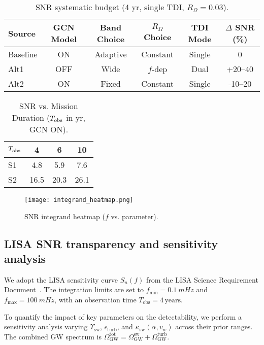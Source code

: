 \documentclass[preprint,aps,prd,onecolumn,nofootinbib,longbibliography]{revtex4-2}
\numberwithin{equation}{section}
\begin{document}
\begin{table}[h]
\centering
\caption{SNR systematic budget (4 yr, single TDI, $R_\Omega=0.03$).}
\begin{tabular}{lccccc}
\toprule
Source & GCN Model & Band Choice & $R_\Omega$ Choice & TDI Mode & $\Delta$ SNR (\%) \\
\midrule
Baseline & ON & Adaptive & Constant & Single & 0 \\
Alt1 & OFF & Wide & $f$-dep & Dual & +20--40 \\
Alt2 & ON & Fixed & Constant & Single & -10--20 \\
\bottomrule
\end{tabular}
\label{tab:snr_systematics}
\end{table}

\begin{table}[h]
\centering
\caption{SNR vs. Mission Duration ($T_{\rm obs}$ in yr, GCN ON).}
\begin{tabular}{lccc}
\toprule
$T_{\rm obs}$ & 4 & 6 & 10 \\
\midrule
S1 & 4.8 & 5.9 & 7.6 \\
S2 & 16.5 & 20.3 & 26.1 \\
\bottomrule
\end{tabular}
\label{tab:snr_duration}
\end{table}
\FloatBarrier
\begin{figure}[!htbp] %
  \centering
  \texttt{[image: integrand\_heatmap.png]}
  \caption{SNR integrand heatmap (\(f\) vs. parameter).}
  \label{fig:integrand_heatmap}
\end{figure}

\subsection{LISA SNR transparency and sensitivity analysis}
\label{sec:snr_transparency}

We adopt the LISA sensitivity curve $ S_n(f) $ from the LISA Science Requirement Document~\cite{Amaro2017}. 
The integration limits are set to $ f_{\min} = \SI{0.1}{mHz} $ and $ f_{\max} = \SI{100}{mHz} $, 
with an observation time $ T_{\mathrm{obs}} = 4\,\mathrm{years} $.

To quantify the impact of key parameters on the detectability, we perform a sensitivity analysis 
varying $ \Upsilon_{\mathrm{sw}} $, $ \epsilon_{\mathrm{turb}} $, and $ \kappa_{\mathrm{sw}}(\alpha, v_w) $ 
across their prior ranges. The combined GW spectrum is 
$ \Omega_{\mathrm{GW}}^{\mathrm{tot}} = \Omega_{\mathrm{GW}}^{\mathrm{sw}} + \Omega_{\mathrm{GW}}^{\mathrm{turb}} $.
\end{document}

